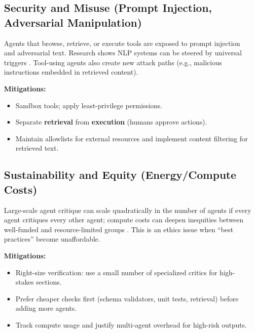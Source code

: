 \documentclass[11pt]{article}
\begin{document}
\subsection{Security and Misuse (Prompt Injection, Adversarial Manipulation)}
Agents that browse, retrieve, or execute tools are exposed to prompt injection and adversarial text. Research shows NLP systems can be steered by universal triggers \citep{wallace2019}. Tool-using agents also create new attack paths (e.g., malicious instructions embedded in retrieved content).

\textbf{Mitigations:}
\begin{itemize}
\item Sandbox tools; apply least-privilege permissions.
\item Separate \textbf{retrieval} from \textbf{execution} (humans approve actions).
\item Maintain allowlists for external resources and implement content filtering for retrieved text.
\end{itemize}

\subsection{Sustainability and Equity (Energy/Compute Costs)}
Large-scale agent critique can scale quadratically in the number of agents if every agent critiques every other agent; compute costs can deepen inequities between well-funded and resource-limited groups \citep{strubell2019}. This is an ethics issue when ``best practices'' become unaffordable.

\textbf{Mitigations:}
\begin{itemize}
\item Right-size verification: use a small number of specialized critics for high-stakes sections.
\item Prefer cheaper checks first (schema validators, unit tests, retrieval) before adding more agents.
\item Track compute usage and justify multi-agent overhead for high-risk outputs.
\end{itemize}
\end{document}
